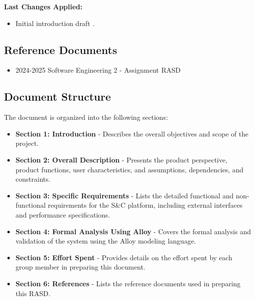 \textbf{Last Changes Applied:}

\begin{itemize}
        \item Initial introduction draft . 
\end{itemize}

\subsection{Reference Documents}
\begin{itemize}
    \item 2024-2025 Software Engineering 2 - Assignment RASD
\end{itemize}

\subsection{Document Structure}
The document is organized into the following sections:
\begin{itemize}
    \item \textbf{Section 1: Introduction} - Describes the overall objectives and scope of the project.
    \item \textbf{Section 2: Overall Description} - Presents the product perspective, product functions, user characteristics, and assumptions, dependencies, and constraints.
    \item \textbf{Section 3: Specific Requirements} - Lists the detailed functional and non-functional requirements for the S\&C platform, including external interfaces and performance specifications.
    \item \textbf{Section 4: Formal Analysis Using Alloy} - Covers the formal analysis and validation of the system using the Alloy modeling language.
    \item \textbf{Section 5: Effort Spent} - Provides details on the effort spent by each group member in preparing this document.
    \item \textbf{Section 6: References} - Lists the reference documents used in preparing this RASD.
\end{itemize}

\newpage

